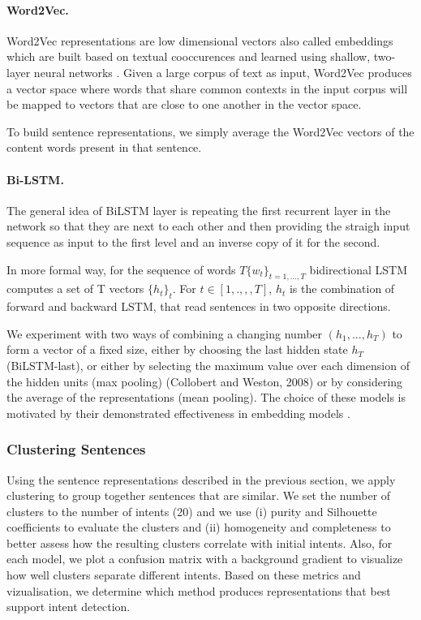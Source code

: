 \documentclass[11pt]{article}
\begin{document}
\paragraph{Word2Vec.} Word2Vec representations are low dimensional vectors also called embeddings which are built based on textual
cooccurences and learned using shallow, two-layer neural networks
\cite{Mikolov2013EfficientEO}. Given a large corpus of text as input,
Word2Vec produces a vector space where words that share common
contexts in the input corpus will be mapped to vectors that are close
to one another in the vector space.


To build sentence representations, we simply average the Word2Vec
vectors of the content words present in that sentence.

\paragraph{Bi-LSTM.} The general idea of BiLSTM layer is repeating the first recurrent layer in the network so that they are next to each other and then providing the straigh input sequence as input to the first level and an inverse copy of it for the second.

In more formal way, for the sequence of words $T \{w_{t}\}_{t = 1, ..., T}$ bidirectional LSTM computes a set of T vectors $\{h_{t}\}_{t}$. For $t ∈ [1 ,. ,,, T]$, $h_{t}$ is the combination of forward and backward LSTM, that read sentences in two opposite directions. 

We experiment with two ways of combining a changing number $(h_{1}, ..., h_{T})$ to form a vector of a fixed size, either by choosing the last hidden state $h_{T}$ (BiLSTM-last), or either by selecting the maximum value over each dimension of the hidden units (max pooling) (Collobert and Weston, 2008) or by considering the average of the representations (mean pooling). The choice of these models is motivated by their demonstrated effectiveness in embedding models \cite{P18-1198}.


\subsubsection{Clustering Sentences}

Using the sentence representations described in the previous section,
we apply clustering to group together sentences that are similar.  We
set the number of clusters to the number of intents (20) and we use
(i) purity and Silhouette coefficients to evaluate the clusters
 and (ii) homogeneity and completeness to better assess how the
resulting clusters correlate with initial intents. Also, for each
model, we plot a confusion matrix with a background gradient to
visualize how well clusters separate different intents. Based on these
metrics and vizualisation, we determine which method produces
representations that best support intent detection.
\end{document}
